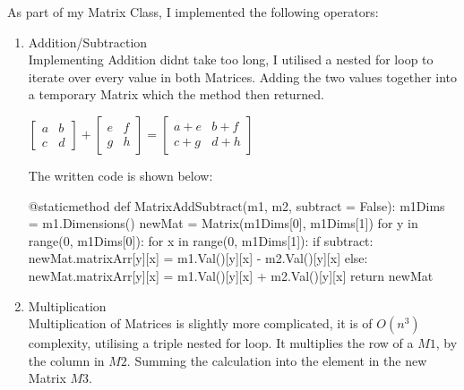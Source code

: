 \begin{flushleft}
                \vspace{0.25cm}
                As part of my Matrix Class, I implemented the following operators:
                \begin{enumerate}
                    \item Addition/Subtraction \\
                        Implementing Addition didnt take too long, I utilised a nested for loop to iterate over every value in both Matrices.
                        Adding the two values together into a temporary Matrix which the method then returned. 
                        \vspace{0.25cm}
                        \begin{center}
                            $\begin{bmatrix}
                                a & b\\
                                c & d
                            \end{bmatrix} +
                            \begin{bmatrix}
                                e & f\\
                                g & h
                            \end{bmatrix} =
                            \begin{bmatrix}
                                a+e & b+f\\
                                c+g & d+h
                            \end{bmatrix}$
                        \end{center}
                        \vspace{0.25cm}

                        The written code is shown below:
                        \begin{pythoncode}
@staticmethod
def MatrixAddSubtract(m1, m2, subtract = False):
    m1Dims = m1.Dimensions()
    newMat = Matrix(m1Dims[0], m1Dims[1])
    for y in range(0, m1Dims[0]):
        for x in range(0, m1Dims[1]):
            if subtract:
                newMat.matrixArr[y][x] = m1.Val()[y][x] - m2.Val()[y][x]
            else:
                newMat.matrixArr[y][x] = m1.Val()[y][x] + m2.Val()[y][x]
    return newMat
                        \end{pythoncode}

                    \item Multiplication \\
                        Multiplication of Matrices is slightly more complicated, it is of $O(n^3)$ complexity, utilising a triple nested for loop.
                        It multiplies the row of a $M1$, by the column in $M2$. Summing the calculation into the element in the new Matrix $M3$. \\
                        

\end{enumerate}
\end{flushleft}
